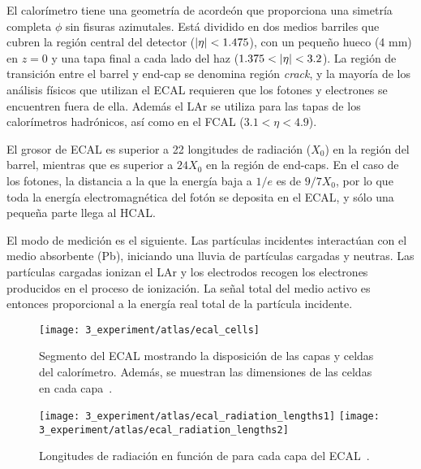 El calorímetro tiene una geometría de acordeón que proporciona una simetría completa \(\phi\) sin fisuras azimutales.
Está dividido en dos medios barriles que cubren la región central del detector (\(|\eta|<1.475\)), con un pequeño hueco (4 mm) en $z = 0$ y una tapa final a cada lado del haz (\(1.375<\abseta<3.2\)).
La región de transición entre el barrel y end-cap se denomina región \textit{crack}, y la mayoría de los análisis físicos que utilizan el \ac{ECAL} requieren que los fotones y electrones se encuentren fuera de ella.
Además el \ac{LAr} se utiliza para las tapas de los calorímetros hadrónicos, así como en el \acf{FCAL} ($3.1 < \eta < 4.9$).

El grosor de \ac{ECAL} es superior a 22 longitudes de radiación (\(X_0\)) en la región del barrel, mientras que es superior a \(24 X_0\) en la región de end-caps. En el caso de los fotones, la distancia a la que la energía baja a \(1/e\) es de \(9/7 X_0\), por lo que toda la energía electromagnética del fotón se deposita en el \ac{ECAL}, y sólo una pequeña parte llega al \ac{HCAL}.

El modo de medición es el siguiente. Las partículas incidentes interactúan con el medio absorbente (Pb), iniciando una lluvia de partículas cargadas y neutras. Las partículas cargadas ionizan el \ac{LAr} y los electrodos recogen los electrones producidos en el proceso de ionización. La señal total del medio activo es entonces proporcional a la energía real total de la partícula incidente.

\begin{figure}[ht!]
    \centering
    \texttt{[image: 3\_experiment/atlas/ecal\_cells]}
    \caption{Segmento del \ac{ECAL} mostrando la disposici\'on de las capas y celdas del calor\'imetro. Adem\'as, se muestran las dimensiones de las celdas en cada capa~\cite{ATLAS}.}
    \label{fig:atlas:atlas:cals:ecal:ecal_cells}
\end{figure}

\begin{figure}[ht!]
    \centering
    \texttt{[image: 3\_experiment/atlas/ecal\_radiation\_lengths1]}
    \texttt{[image: 3\_experiment/atlas/ecal\_radiation\_lengths2]}
    \caption{Longitudes de radiaci\'on en funci\'on de \abseta para cada capa del \ac{ECAL}~\cite{ATLAS}.}
    \label{fig:atlas:atlas:cals:ecal:ecal_radiation_length}
\end{figure}

